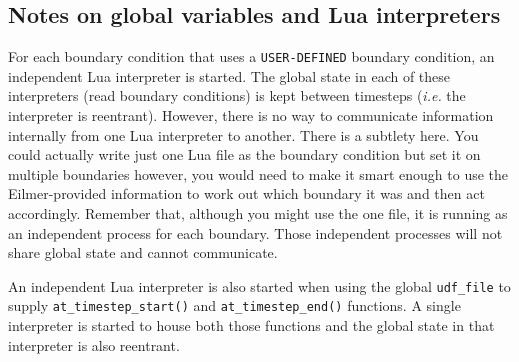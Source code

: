 \subsection{Notes on global variables and Lua interpreters}
%
For each boundary condition that uses a \verb!USER-DEFINED! boundary condition, 
an independent Lua interpreter is started. 
The global state in each of these interpreters (read boundary conditions) 
is kept between timesteps (\textit{i.e.} the interpreter is reentrant). 
However, there is no way to communicate information internally from one Lua interpreter to another. 
There is a subtlety here. 
You could actually write just one Lua file as the boundary condition but set it on multiple boundaries 
however, you would need to make it smart enough to use the Eilmer-provided information to work out 
which boundary it was and then act accordingly. 
Remember that, although you might use the one file, 
it is running as an independent process for each boundary. 
Those independent processes will not share global state and cannot communicate.

\medskip
An independent Lua interpreter is also started when using the global \verb!udf_file! 
to supply \verb!at_timestep_start()! and \verb!at_timestep_end()! functions. 
A single interpreter is started to house both those functions and 
the global state in that interpreter is also reentrant. 


